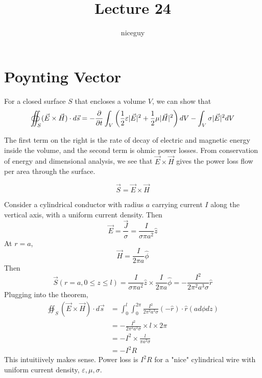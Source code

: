 \documentclass[12pt]{article}
\title{Lecture 24}
\author{niceguy}
\begin{document}
\maketitle

\section{Poynting Vector}

\begin{thm}
    For a closed surface $S$ that encloses a volume $V$, we can show that
    $$\oiint_S (\vec E \times \vec H) \cdot d\vec s = -\frac{\partial }{\partial t} \int_V \left(\frac{1}{2} \varepsilon|\vec E|^2 + \frac{1}{2}\mu|\vec H|^2\right)dV - \int_V \sigma|\vec E|^2dV$$
\end{thm}

The first term on the right is the rate of decay of electric and magnetic energy inside the volume, and the second term is ohmic power losses. From conservation of energy and dimensional analysis, we see that $\vec E \times \vec H$ gives the power loss flow per area through the surface.

\begin{defn}
    $$\vec S = \vec E \times \vec H$$
\end{defn}

\begin{ex}
    Consider a cylindrical conductor with radius $a$ carrying current $I$ along the vertical axis, with a uniform current density. Then
    $$\vec E = \frac{\vec J}{\sigma} = \frac{I}{\sigma \pi a^2}\hat z$$
    At $r = a$,
    $$\vec H = \frac{I}{2\pi a}\hat\phi$$
    Then
    $$\vec S(r=a,0\le z \le l) = \frac{I}{\sigma\pi a^2} \hat z \times \frac{I}{2\pi a} \hat\phi = - \frac{I^2}{2\pi^2 a^3\sigma}\hat r$$
    Plugging into the theorem,
    \begin{align*}
        \oiint_S (\vec E \times \vec H) \cdot d\vec s &= \int_0^l \int_0^{2\pi} \frac{I^2}{2\pi^2 a^3\sigma} (-\hat r) \cdot \hat r(ad\phi dz) \\
                                                      &= -\frac{I^2}{2\pi^2 a^2\sigma} \times l \times 2\pi \\
                                                      &= -I^2 \times \frac{l}{\pi a^2\sigma} \\
                                                      &= -I^2R
    \end{align*}
    This intuitiively makes sense. Power loss is $I^2R$ for a "nice" cylindrical wire with uniform current density, $\varepsilon,\mu,\sigma$.
\end{ex}
\end{document}
